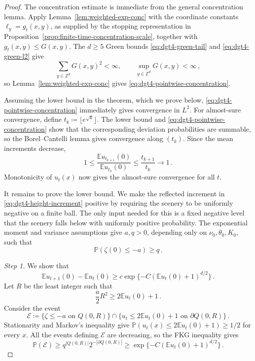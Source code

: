 \documentclass[11pt]{amsart}
\theoremstyle{plain}
\theoremstyle{definition}
\newcommand{\Z}{\mathbb{Z}}
\newcommand{\E}{\mathbb{E}}
\renewcommand{\P}{\mathbb{P}}
\begin{document}
	\begin{proof}
		The concentration estimate is immediate from the general concentration
		lemma. Apply Lemma~\ref{lem:weighted-exp-conc} with the coordinate
		constants $\ell_y=g_t(x,y)$, as supplied by the stopping representation in
		Proposition~\ref{prop:finite-time-concentration-scale}, together with
		$g_t(x,y)\leq G(x,y)$. The $d\geq5$ Green bounds \eqref{eq:dgt4-green-tail}
		and \eqref{eq:dgt4-green-l2} give
		\[
			\sum_{y\in\Z^d}G(x,y)^2<\infty,
			\qquad
			\sup_{y\in\Z^d}G(x,y)<\infty\, ,
		\]
		so Lemma~\ref{lem:weighted-exp-conc} gives
		\eqref{eq:dgt4-pointwise-concentration}.

			Assuming the lower bound in the theorem, which we prove below,
			\eqref{eq:dgt4-pointwise-concentration} immediately gives convergence in $L^2$. For almost-sure convergence, define $t_k\coloneqq\lfloor e^{\sqrt{k}}\rfloor$. The lower bound and
			\eqref{eq:dgt4-pointwise-concentration} show that the corresponding deviation
			probabilities are summable, so the Borel--Cantelli lemma gives convergence along $(t_k)$. Since the mean increments decrease,
			\[
				1\leq
				\frac{\E u_{t_{k+1}}(0)}{\E u_{t_k}(0)}
				\leq\frac{t_{k+1}}{t_k}
				\longrightarrow1\, .
			\]
			Monotonicity of $u_t(x)$ now gives the almost-sure convergence for all
			$t$.

		It remains to prove the lower bound. We make the reflected increment in
		\eqref{eq:dgt4-height-increment} positive by requiring the scenery to be
		uniformly negative on a finite ball. The only input needed for this is a
		fixed negative level that the scenery falls below with uniformly positive probability. The exponential
		moment and variance assumptions give $a,q>0$, depending only on
		$\nu_0,\theta_0,K_0$, such that
		\[
			\P(\zeta(0)\leq-a)\geq q\, .
		\]

		\emph{Step 1.} We show that
		\begin{equation}\label{eq:dgt4-increment-finite-ball}
			\E u_{t+1}(0)-\E u_t(0)
			\geq
			c\exp\{-C(\E u_t(0)+1)^{d/2}\}\, .
		\end{equation}
		Let $R$ be the least integer such that
		\[
			\frac a2 R^2\geq2\E u_t(0)+1\, .
		\]
		Consider the event
		\[
			\mathcal E\coloneqq
			\{\zeta\leq-a\text{ on }Q(0,R)\}
			\cap
			\{u_t\leq2\E u_t(0)+1\text{ on }\partial Q(0,R)\}\, .
		\]
		Stationarity and Markov's inequality give
		$\P(u_t(x)\leq2\E u_t(0)+1)\geq1/2$ for every $x$. All the events
		defining $\mathcal E$ are decreasing, so the FKG inequality gives
		\[
			\P(\mathcal E)
			\geq q^{|Q(0,R)|}2^{-|\partial Q(0,R)|}
			\geq \exp\{-C(\E u_t(0)+1)^{d/2}\}\, .
		\]
		

\end{proof}
\end{document}
